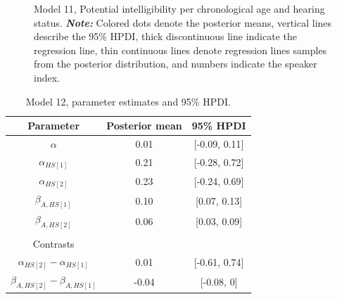 \documentclass[
  authoryear,
  preprint,
  1p]{elsarticle}
\begin{document}
\label{cell-fig-rq3-intelligibility-model11}
\begin{figure}[H]


\caption{\label{fig-rq3-intelligibility-model11}Model 11, Potential
intelligibility per chronological age and hearing status.
{\textbf{\emph{Note:}} Colored dots denote the posterior means, vertical
lines describe the 95\% HPDI, thick discontinuous line indicate the
regression line, thin continuous lines denote regression lines samples
from the posterior distribution, and numbers indicate the speaker
index.}}

\end{figure}%

\begin{longtable}[]{@{}ccc@{}}

\caption{\label{tbl-parameter-model12}{Model 12, parameter estimates and
95\% HPDI.}}

\tabularnewline

\toprule\noalign{}
Parameter & Posterior mean & 95\% HPDI \\
\midrule\noalign{}
\endhead
\bottomrule\noalign{}
\endlastfoot
\(\alpha\) & 0.01 & {[}-0.09, 0.11{]} \\
\(\alpha_{HS[1]}\) & 0.21 & {[}-0.28, 0.72{]} \\
\(\alpha_{HS[2]}\) & 0.23 & {[}-0.24, 0.69{]} \\
\(\beta_{A,HS[1]}\) & 0.10 & {[}0.07, 0.13{]} \\
\(\beta_{A,HS[2]}\) & 0.06 & {[}0.03, 0.09{]} \\
& & \\
Contrasts & & \\
\(\alpha_{HS[2]} - \alpha_{HS[1]}\) & 0.01 & {[}-0.61, 0.74{]} \\
\(\beta_{A,HS[2]} - \beta_{A,HS[1]}\) & -0.04 & {[}-0.08, 0{]} \\

\end{longtable}
\end{document}
